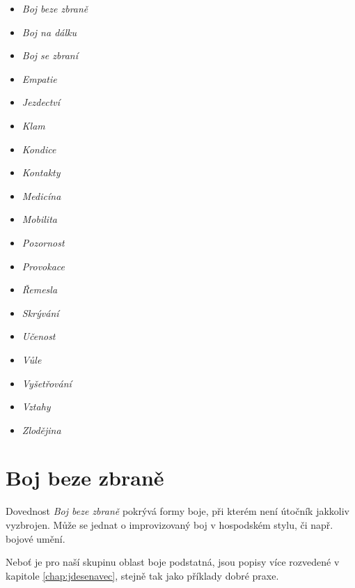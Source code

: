 \begin{multicols}{2}
\begin{itemize}
\item \textit{Boj beze zbraně}
\item \textit{Boj na dálku}
\item \textit{Boj se zbraní}
\item \textit{Empatie}
\item \textit{Jezdectví}
\item \textit{Klam}
\item \textit{Kondice}
\item \textit{Kontakty}
\item \textit{Medicína}
\item \textit{Mobilita}
\item \textit{Pozornost}
\item \textit{Provokace}
\item \textit{Řemesla}
\item \textit{Skrývání}
\item \textit{Učenost}
\item \textit{Vůle}
\item \textit{Vyšetřování}
\item \textit{Vztahy}
\item \textit{Zlodějina}
\end{itemize}
\end{multicols}


\section{Boj beze zbraně}
\label{sec:bojbezezbrane}

Dovednost \textit{Boj beze zbraně} pokrývá formy boje, při kterém není útočník jakkoliv vyzbrojen. Může se jednat o improvizovaný boj v hospodském stylu, či např. bojové umění.

Neboť je pro naší skupinu oblast boje podstatná, jsou popisy více rozvedené v kapitole \ref{chap:jdesenavec}, stejně tak jako příklady dobré praxe.\\
   
